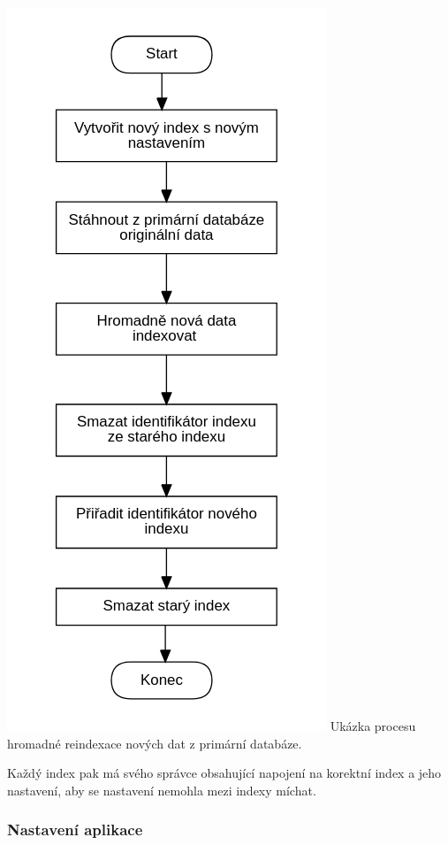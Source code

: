 		\includegraphics{obrazky/proces_reindexace_z_db}\hfill
		Ukázka procesu hromadné reindexace nových dat z primární databáze. %

		Každý index pak má svého správce obsahující napojení na korektní index a jeho nastavení, aby se nastavení nemohla
		mezi indexy míchat.

		\subsubsection{Nastavení aplikace}

